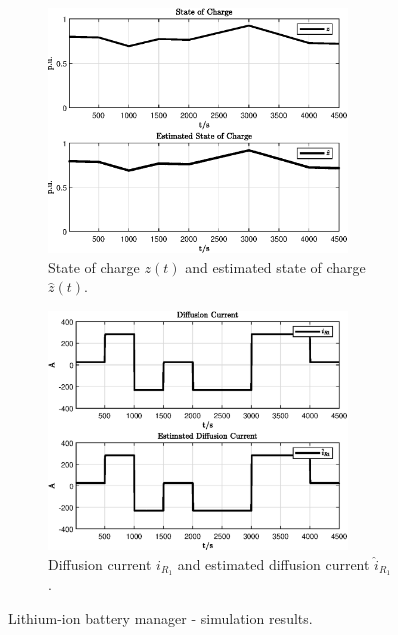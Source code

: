 \documentclass[11pt,a4paper,oneside]{book}
\numberwithin{equation}{section}
\theoremstyle{it}
\theoremstyle{definition}
\begin{document}
\begin{figure}[H]
	\centering
	\begin{subfigure}{.5\textwidth}
		\centering
		\includegraphics[width = 225pt, angle=0, 
		keepaspectratio]{figures/lithium_ion_battery/state_state_hat_1.eps}
		\captionsetup{width=0.65\textwidth, font=footnotesize}
		\caption{State of charge $z(t)$ and estimated state of charge 
			$\hat{z}(t)$.}
		\label{}
	\end{subfigure}%
	\begin{subfigure}{.5\textwidth}
		\centering
		\includegraphics[width = 225pt, angle=0, 
		keepaspectratio]{figures/lithium_ion_battery/state_state_hat_2.eps}
		\captionsetup{width=0.65\textwidth, font=footnotesize}
		\caption{Diffusion current $i_{R_1}$ and estimated diffusion current 
			$\hat{i}_{R_1}$.}
		\label{}
	\end{subfigure}
	\captionsetup{width=0.5\textwidth, font=small}
	\caption{Lithium-ion battery manager - simulation results.}
	\label{}
\end{figure}
\end{document}
